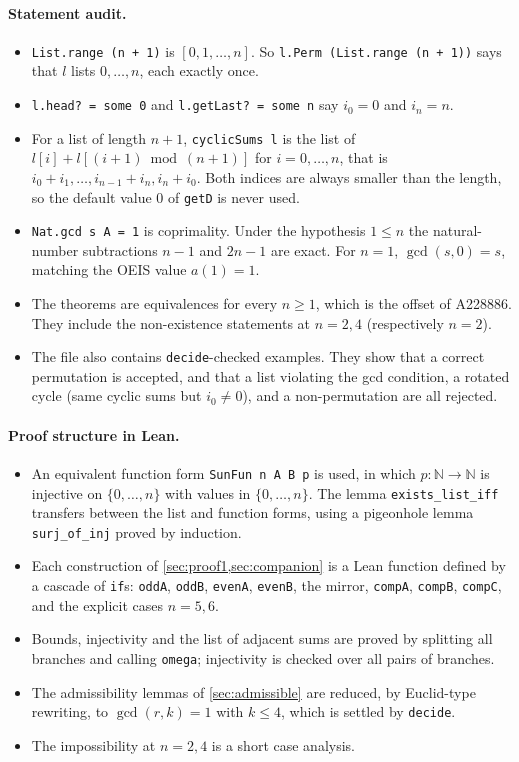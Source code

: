 \documentclass[11pt]{article}
\numberwithin{equation}{section}
\theoremstyle{definition}
\theoremstyle{remark}
\newcommand{\N}{\mathbb N}
\begin{document}
\paragraph{Statement audit.}
\begin{itemize}
  \item \texttt{List.range (n + 1)} is $[0,1,\dots,n]$. So \texttt{l.Perm (List.range (n + 1))}
  says that $l$ lists $0,\dots,n$, each exactly once.
  \item \texttt{l.head? = some 0} and \texttt{l.getLast? = some n} say $i_0=0$ and $i_n=n$.
  \item For a list of length $n+1$, \texttt{cyclicSums l} is the list of
  $l[i]+l[(i+1)\bmod(n+1)]$ for $i=0,\dots,n$, that is $i_0+i_1,\dots,i_{n-1}+i_n,i_n+i_0$. Both
  indices are always smaller than the length, so the default value $0$ of \texttt{getD} is never
  used.
  \item \texttt{Nat.gcd s A = 1} is coprimality. Under the hypothesis $1\le n$ the natural-number
  subtractions $n-1$ and $2n-1$ are exact. For $n=1$, $\gcd(s,0)=s$, matching the OEIS value
  $a(1)=1$.
  \item The theorems are equivalences for every $n\ge1$, which is the offset of A228886. They include
  the non-existence statements at $n=2,4$ (respectively $n=2$).
  \item The file also contains \texttt{decide}-checked examples. They show that a correct
  permutation is accepted, and that a list violating the gcd condition, a rotated cycle (same cyclic
  sums but $i_0\neq0$), and a non-permutation are all rejected.
\end{itemize}

\paragraph{Proof structure in Lean.}
\begin{itemize}
  \item An equivalent function form \texttt{SunFun n A B p} is used, in which
  $p:\N\to\N$ is injective on $\{0,\dots,n\}$ with values in $\{0,\dots,n\}$. The lemma
  \texttt{exists\_list\_iff} transfers between the list and function forms, using a pigeonhole
  lemma \texttt{surj\_of\_inj} proved by induction.
  \item Each construction of \cref{sec:proof1,sec:companion} is a Lean function defined by a cascade
  of \texttt{if}s: \texttt{oddA}, \texttt{oddB}, \texttt{evenA}, \texttt{evenB}, the mirror,
  \texttt{compA}, \texttt{compB}, \texttt{compC}, and the explicit cases $n=5,6$.
  \item Bounds, injectivity and the list of adjacent sums are proved by splitting all branches and
  calling \texttt{omega}; injectivity is checked over all pairs of branches.
  \item The admissibility lemmas of \cref{sec:admissible} are reduced, by Euclid-type rewriting, to
  $\gcd(r,k)=1$ with $k\le 4$, which is settled by \texttt{decide}.
  \item The impossibility at $n=2,4$ is a short case analysis.
\end{itemize}
\end{document}

